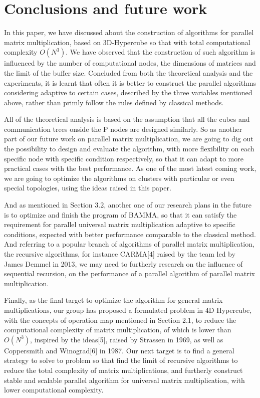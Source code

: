 \documentclass{amsart}
\theoremstyle{definition}
\theoremstyle{remark}
\numberwithin{equation}{section}
\begin{document}
\section{Conclusions and future work}
	In this paper, we have discussed about the construction of algorithms for parallel matrix multiplication, based on 3D-Hypercube so that with total computational complexity $O(N^3)$. We have observed that the construction of such algorithm is influenced by the number of computational nodes, the dimensions of matrices and the limit of the buffer size. Concluded from both the theoretical analysis and the experiments, it is learnt that often it is better to construct the parallel algorithms considering adaptive to certain cases, described by the three variables mentioned above, rather than primly follow the rules defined by classical methods.
	
	All of the theoretical analysis is based on the assumption that all the cubes and communication trees onside the P nodes are designed similarly. So as another part of our future work on parallel matrix multiplication, we are going to dig out the possibility to design and evaluate the algorithm, with more flexibility on each specific node with specific condition respectively, so that it can adapt to more practical cases with the best performance. As one of the most latest coming work, we are going to optimize the algorithms on clusters with particular or even special topologies, using the ideas raised in this paper.
	
	And as mentioned in Section 3.2, another one of our research plans in the future is to optimize and finish the program of BAMMA, so that it can satisfy the requirement for parallel universal matrix multiplication adaptive to specific conditions, expected with better performance comparable to the classical method. And referring to a popular branch of algorithms of parallel matrix multiplication, the recursive algorithms, for instance CARMA[4] raised by the team led by James Demmel in 2013, we may need to furtherly research on the influence of sequential recursion, on the performance of a parallel algorithm of parallel matrix multiplication.
	
	Finally, as the final target to optimize the algorithm for general matrix multiplications, our group has proposed a formulated problem in 4D Hypercube, with the concepts of operation map mentioned in Section 2.1, to reduce the computational complexity of matrix multiplication, of which is lower than $O(N^3)$, inspired by the ideas[5], raised by Strassen in 1969, as well as Coppersmith and Winograd[6] in 1987. Our next target is to find a general strategy to solve to problem so that find the limit of recursive algorithms to reduce the total complexity of matrix multiplications, and furtherly construct stable and scalable parallel algorithm for universal matrix multiplication, with lower computational complexity.
\end{document}
